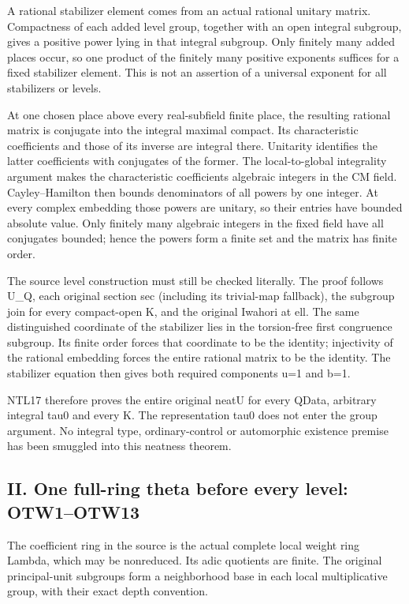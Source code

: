 A rational stabilizer element comes from an actual rational unitary matrix. Compactness of each added level group, together with an open integral subgroup, gives a positive power lying in that integral subgroup. Only finitely many added places occur, so one product of the finitely many positive exponents suffices for a fixed stabilizer element. This is not an assertion of a universal exponent for all stabilizers or levels.

At one chosen place above every real-subfield finite place, the resulting rational matrix is conjugate into the integral maximal compact. Its characteristic coefficients and those of its inverse are integral there. Unitarity identifies the latter coefficients with conjugates of the former. The local-to-global integrality argument makes the characteristic coefficients algebraic integers in the CM field. Cayley–Hamilton then bounds denominators of all powers by one integer. At every complex embedding those powers are unitary, so their entries have bounded absolute value. Only finitely many algebraic integers in the fixed field have all conjugates bounded; hence the powers form a finite set and the matrix has finite order.

The source level construction must still be checked literally. The proof follows U\_\allowbreak{}Q, each original section sec (including its trivial-map fallback), the subgroup join for every compact-open K, and the original Iwahori at ell. The same distinguished coordinate of the stabilizer lies in the torsion-free first congruence subgroup. Its finite order forces that coordinate to be the identity; injectivity of the rational embedding forces the entire rational matrix to be the identity. The stabilizer equation then gives both required components u=1 and b=1.

NTL17 therefore proves the entire original neatU for every QData, arbitrary integral tau0 and every K. The representation tau0 does not enter the group argument. No integral type, ordinary-control or automorphic existence premise has been smuggled into this neatness theorem.

\subsection{II. One full-ring theta before every level: OTW1–OTW13}

The coefficient ring in the source is the actual complete local weight ring Lambda, which may be nonreduced. Its adic quotients are finite. The original principal-unit subgroups form a neighborhood base in each local multiplicative group, with their exact depth convention.

